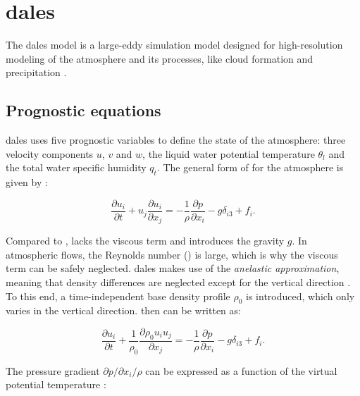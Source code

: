 \section{\acrshort{dales}}
The \acrfull{dales} model is a large-eddy simulation model designed for high-resolution modeling of the atmosphere and its processes, like cloud formation and precipitation \citep{heusFormulationDutchAtmospheric2010,ouwerslootLargeEddySimulationComparison2017}. 

\subsection{Prognostic equations}
\acrshort{dales} uses five prognostic variables to define the state of the atmosphere: three velocity components $u$, $v$ and $w$, the liquid water potential temperature $\theta_l$ and the total water specific humidity $q_t$. The general form of  for the atmosphere is given by \citep{stullIntroductionBoundaryLayer1988}:

\begin{equation}
    \frac{\partial u_i}{\partial t} + u_j \frac{\partial u_i}{\partial x_j} = - \frac{1}{\rho} \frac{\partial p}{\partial x_i} - g \delta_{i3} + f_i. \label{eq:momentum_atmos}
\end{equation}

Compared to ,  lacks the viscous term and introduces the gravity $g$. In atmospheric flows, the Reynolds number () is large, which is why the viscous term can be safely neglected. \acrshort{dales} makes use of the \emph{anelastic approximation}, meaning that density differences are neglected except for the vertical direction \citep{boingInteractionDeepConvective2014}. To this end, a time-independent base density profile $\rho_0$ is introduced, which only varies in the vertical direction.  then can be written as:

\begin{equation}
    \frac{\partial u_i}{\partial t} + \frac{1}{\rho_0} \frac{\partial \rho_0 u_i u_j}{\partial x_j} = - \frac{1}{\rho} \frac{\partial p}{\partial x_i} - g \delta_{i3} + f_i. \label{eq:momentum_atmos_rho0}
\end{equation}

The pressure gradient $\partial p / \partial x_i / \rho$ can be expressed as a function of the virtual potential temperature \citep{boingInteractionDeepConvective2014}:

